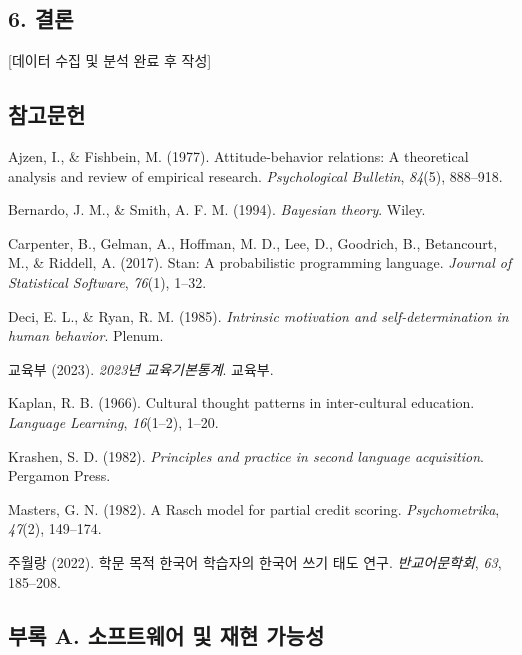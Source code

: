 \documentclass[a4paper,10pt]{oblivoir}
\begin{document}
\subsection{6. 결론}

[데이터 수집 및 분석 완료 후 작성]


\subsection{참고문헌}

Ajzen, I., \& Fishbein, M. (1977). Attitude-behavior relations: A theoretical analysis and review of empirical research. \textit{Psychological Bulletin}, \textit{84}(5), 888–918.

Bernardo, J. M., \& Smith, A. F. M. (1994). \textit{Bayesian theory}. Wiley.

Carpenter, B., Gelman, A., Hoffman, M. D., Lee, D., Goodrich, B., Betancourt, M., \& Riddell, A. (2017). Stan: A probabilistic programming language. \textit{Journal of Statistical Software}, \textit{76}(1), 1–32.

Deci, E. L., \& Ryan, R. M. (1985). \textit{Intrinsic motivation and self-determination in human behavior}. Plenum.

교육부 (2023). \textit{2023년 교육기본통계}. 교육부.

Kaplan, R. B. (1966). Cultural thought patterns in inter-cultural education. \textit{Language Learning}, \textit{16}(1–2), 1–20.

Krashen, S. D. (1982). \textit{Principles and practice in second language acquisition}. Pergamon Press.

Masters, G. N. (1982). A Rasch model for partial credit scoring. \textit{Psychometrika}, \textit{47}(2), 149–174.

주월랑 (2022). 학문 목적 한국어 학습자의 한국어 쓰기 태도 연구. \textit{반교어문학회}, \textit{63}, 185–208.


\subsection{부록 A. 소프트웨어 및 재현 가능성}
\end{document}
